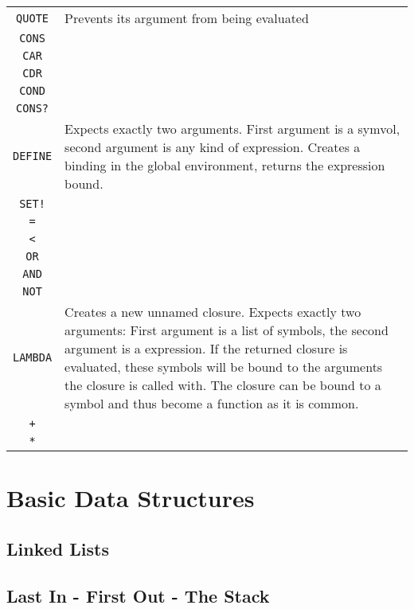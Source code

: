 \documentclass[12pt]{article}
\begin{document}
\begin{table}[h]
    \centering
    \begin{tabular}{c|l}
        \texttt{QUOTE} & Prevents its argument from being evaluated \\
        \texttt{CONS} & \\
        \texttt{CAR} & \\
        \texttt{CDR} & \\
        \texttt{COND} & \\
        \texttt{CONS?} & \\
        \texttt{DEFINE} & Expects exactly two arguments. First argument is a
        symvol, second argument is any kind of expression. Creates a binding in
        the global environment, returns the expression bound.\\
        \texttt{SET!} & \\
        \texttt{=} & \\
        \texttt{<} & \\
        \texttt{OR} & \\
        \texttt{AND} & \\
        \texttt{NOT} & \\
        \texttt{LAMBDA} & Creates a new unnamed closure. Expects exactly two
        arguments: First argument is a list of symbols, the second argument is a
        expression. If the returned closure is evaluated, these symbols will be
        bound to the arguments the closure is called with. The closure can be
        bound to a symbol and thus become a function as it is common.\\
        \texttt{+} & \\
        \texttt{*} & 
    \end{tabular}
    \caption{\label{tbl:CoreFunctions}}
\end{table}


\section{Basic Data Structures}

\subsection{Linked Lists}

\subsection{Last In - First Out - The Stack}
\end{document}
